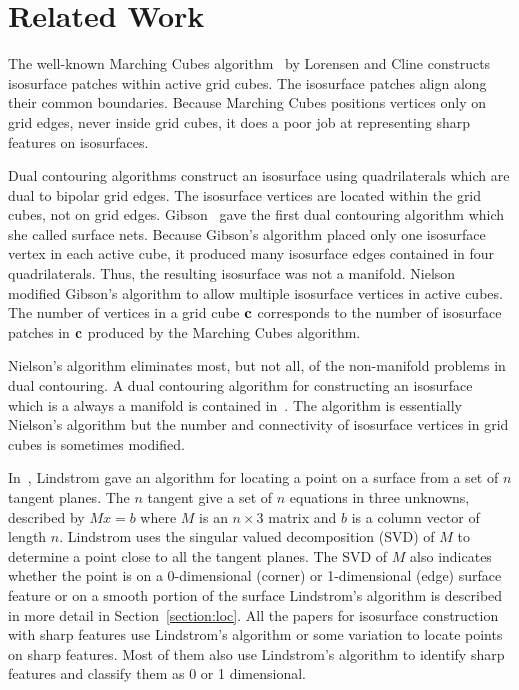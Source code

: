 

\section{Related Work}
\label{section:related}

The well-known Marching Cubes algorithm~\cite{lc-mchr3-87}
by Lorensen and Cline
constructs isosurface patches within active grid cubes.
The isosurface patches align along their common boundaries.
Because Marching Cubes positions vertices only on grid edges,
never inside grid cubes,
it does a poor job at representing sharp features on isosurfaces.

Dual contouring algorithms construct an isosurface using quadrilaterals
which are dual to bipolar grid edges.
The isosurface vertices are located within the grid cubes,
not on grid edges.
Gibson~\cite{gh-ssqem-97,g-cesng-98} gave the first dual contouring algorithm
which she called surface nets.
Because Gibson's algorithm placed only one isosurface vertex 
in each active cube,
it produced many isosurface edges contained in four quadrilaterals.
Thus, the resulting isosurface was not a manifold.
Nielson~\cite{n-dmc-04} modified Gibson's algorithm
to allow multiple isosurface vertices in active cubes.
The number of vertices in a grid cube $\mathbf{c}$
corresponds to the number of isosurface patches in $\mathbf{c}$
produced by the Marching Cubes algorithm.

Nielson's algorithm eliminates most, but not all, 
of the non-manifold problems in dual contouring.
A dual contouring algorithm
for constructing an isosurface which is a always a manifold
is contained in~\cite{Wenger:2013:Isosurfaces}.
The algorithm is essentially Nielson's algorithm
but the number and connectivity of isosurface vertices in grid cubes
is sometimes modified.

In~\cite{l-oslpm-00}, Lindstrom gave an algorithm for locating a point 
on a surface from a set of $n$ tangent planes.
The $n$ tangent give a set of $n$ equations in three unknowns,
described by $M x = b$ where $M$ is an $n \times 3$ matrix 
and $b$ is a column vector of length $n$.
Lindstrom uses the singular valued decomposition (SVD) of $M$
to determine a point close to all the tangent planes.
The SVD of $M$ also indicates whether the point is
on a 0-dimensional (corner) or 1-dimensional (edge) surface feature
or on a smooth portion of the surface
Lindstrom's algorithm is described in more detail 
in Section~\ref{section:loc}.
All the papers for isosurface construction with sharp features
use Lindstrom's algorithm or some variation
to locate points on sharp features.
Most of them also use Lindstrom's algorithm to identify sharp features
and classify them as 0 or 1 dimensional.

